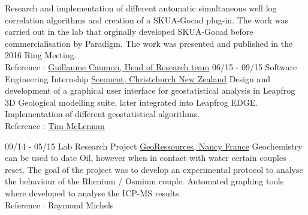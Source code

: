 \documentclass[]{friggeri-cv}
\begin{document}
\begin{entrylist}
    {Research and implementation of different automatic simultaneous well log correlation algorithms and creation of a SKUA-Gocad plug-in. The work was carried out in the lab that orginally developed SKUA-Gocad before commercialisation by Paradigm. The work was presented and published in the 2016 Ring Meeting. \\Reference : \href{mailto:Guillaume.Caumon@ensg.univ-lorraine.fr}{Guillaume Caumon, Head of Research team}}
    \entry
    {06/15 - 09/15}
    {Software Engineering Internship}
    {\href{https://www.seequent.com/}{Seequent, Christchurch New Zealand}}
    {Design and development of a graphical user interface for geostatistical analysis in Leapfrog 3D Geological modelling suite, later integrated into Leapfrog EDGE. Implementation of different geostatistical algorithms.
    \\
    Reference : \href{mailto:tim.mclennan@seequent.com}{Tim McLennan}}
\end{entrylist}

\vspace*{\fill}
\begin{entrylist}
	\entry
	{09/14 - 05/15}
	{Lab Research Project}
	{\href{http://georessources.univ-lorraine.fr/}{GeoRessources, Nancy France}}
	{Geochemistry can be used to date Oil, however when in contact with water certain couples reset. The goal of the project was to develop an experimental protocol to analyse the behaviour of the Rhenium / Osmium couple. Automated graphing tools where developed to analyse the ICP-MS results.
		\\
		Reference : Raymond Michels}
\end{entrylist}
\end{document}
